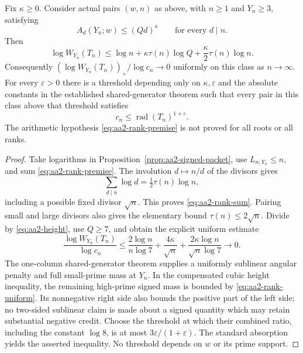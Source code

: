 \begin{theorem}
\label{thm:aa2-rank-budget}
Fix $\kappa\ge0$. Consider actual pairs $(w,n)$ as above, with $n\ge1$
and $Y_n\ge3$, satisfying
\begin{equation}\label{eq:aa2-rank-premise}
 A_d(Y_n;w)\le(Qd)^\kappa\qquad\text{for every }d\mid n.
\end{equation}
Then
\begin{equation}\label{eq:aa2-rank-sum}
 \log W_{Y_n}(T_n)\le\log n+
 \kappa\tau(n)\log Q+\frac\kappa2\tau(n)\log n.
\end{equation}
Consequently $(\log W_{Y_n}(T_n))_+/\log c_n\to0$ uniformly on this class as
$n\to\infty$. For every $\varepsilon>0$ there is a threshold depending
only on $\kappa,\varepsilon$ and the absolute constants in the established
shared-generator theorem such that every pair in this class above that
threshold satisfies
\[
 c_n\le\operatorname{rad}(T_n)^{1+\varepsilon}.
\]
The arithmetic hypothesis \eqref{eq:aa2-rank-premise} is not proved for
all roots or all ranks.
\end{theorem}
\begin{proof}
Take logarithms in Proposition~\ref{prop:aa2-signed-packet}, use
$L_{n,Y_n}\le n$, and sum \eqref{eq:aa2-rank-premise}. The involution
$d\mapsto n/d$ of the divisors gives
\[
 \sum_{d\mid n}\log d=\tfrac12\tau(n)\log n,
\]
including a possible fixed divisor $\sqrt n$. This proves
\eqref{eq:aa2-rank-sum}. Pairing small and large divisors also gives the
elementary bound $\tau(n)\le2\sqrt n$. Divide by
\eqref{eq:aa2-height}, use $Q\ge7$, and obtain the explicit uniform estimate
\begin{equation}\label{eq:aa2-rank-uniform}
 \frac{\log W_{Y_n}(T_n)}{\log c_n}
 \le\frac{2\log n}{n\log7}+
      \frac{4\kappa}{\sqrt n}+
      \frac{2\kappa\log n}{\sqrt n\log7}\longrightarrow0.
\end{equation}
The one-column shared-generator theorem supplies a uniformly sublinear
angular penalty and full small-prime mass at $Y_n$. In the compensated cubic
height inequality, the remaining high-prime signed mass is bounded by
\eqref{eq:aa2-rank-uniform}. Its nonnegative right side also bounds the positive
part of the left side; no two-sided sublinear claim is made about a signed
quantity which may retain substantial negative credit. Choose the threshold at which their combined
ratio, including the constant $\log8$, is at most
$3\varepsilon/(1+\varepsilon)$. The standard absorption yields the asserted
inequality. No threshold depends on $w$ or its prime support.
\end{proof}

